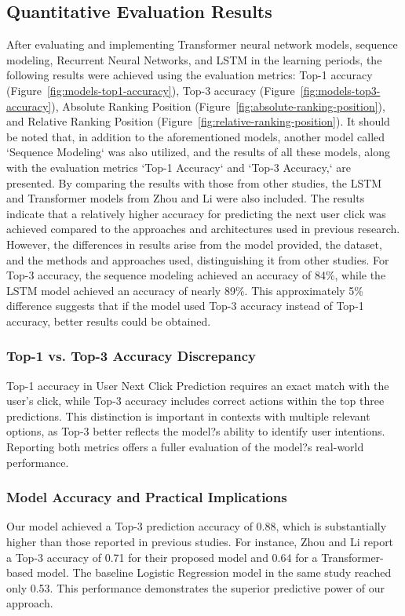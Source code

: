 \documentclass[sn-mathphys-num, Numbered]{sn-jnl}%
\theoremstyle{thmstyleone}%
\theoremstyle{thmstyletwo}%
\theoremstyle{thmstylethree}%
\begin{document}
\subsection{Quantitative Evaluation Results}

\iffalse
After evaluating and implementing Transformer neural network models, sequence modeling, Recurrent Neural Networks, and LSTM in the learning periods, the following results were achieved using the evaluation metrics: Top-1 accuracy (Figure~\ref{fig:models-top1-accuracy}), Top-3 accuracy (Figure~\ref{fig:models-top3-accuracy}), Absolute Ranking Position (Figure~\ref{fig:absolute-ranking-position}), and Relative Ranking Position (Figure~\ref{fig:relative-ranking-position}). It should be noted that, in addition to the aforementioned models, another model called `Sequence Modeling` was also utilized, and the results of all these models, along with the evaluation metrics `Top-1 Accuracy` and `Top-3 Accuracy,` are presented.
By comparing the results with those from other studies, the LSTM and Transformer models from Zhou and Li were also included. The results indicate that a relatively higher accuracy for predicting the next user click was achieved compared to the approaches and architectures used in previous research. However, the differences in results arise from the model provided, the dataset, and the methods and approaches used, distinguishing it from other studies.
For Top-3 accuracy, the sequence modeling achieved an accuracy of 84\%, while the LSTM model achieved an accuracy of nearly 89\%. This approximately 5\% difference suggests that if the model used Top-3 accuracy instead of Top-1 accuracy, better results could be obtained.

\subsubsection{Top-1 vs. Top-3 Accuracy Discrepancy}
Top-1 accuracy in User Next Click Prediction requires an exact match with the user's click, while Top-3 accuracy includes correct actions within the top three predictions. This distinction is important in contexts with multiple relevant options, as Top-3 better reflects the model?s ability to identify user intentions. Reporting both metrics offers a fuller evaluation of the model?s real-world performance.


\subsubsection{Model Accuracy and Practical Implications}
Our model achieved a Top-3 prediction accuracy of 0.88, which is substantially higher than those reported in previous studies. For instance, Zhou and Li \cite{zhou2021large} report a Top-3 accuracy of 0.71 for their proposed model and 0.64 for a Transformer-based model. The baseline Logistic Regression model in the same study reached only 0.53.  This performance demonstrates the superior predictive power of our approach.
\end{document}
